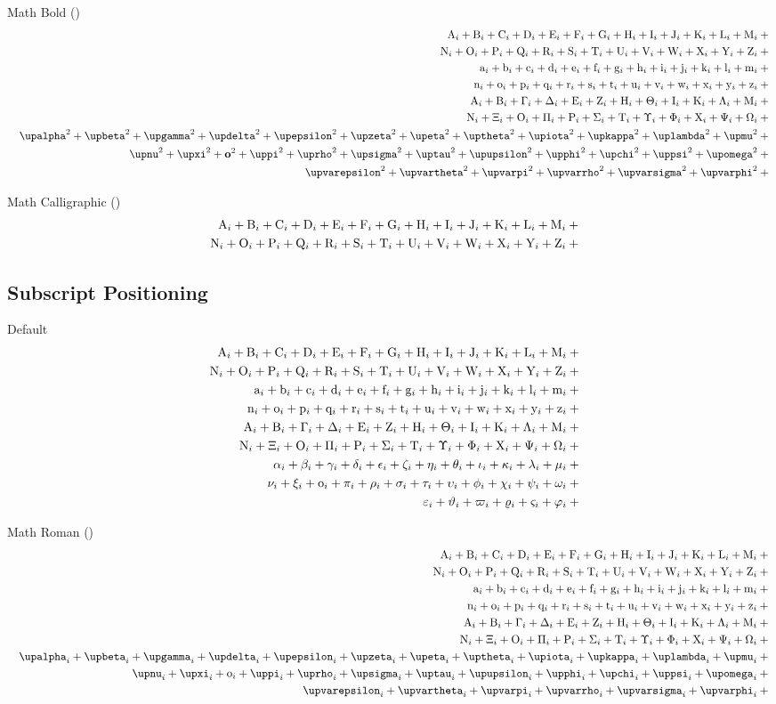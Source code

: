 \documentclass[11pt, a4paper, oneside]{article}
\theoremstyle{Plain}
\theoremstyle{Definition}
\theoremstyle{Remark}
\begin{document}
\begin{appendix}
	Math Bold (\texttt{\string\mathbf})
	\def\test#1{\mathbf{#1}^{2}+{}}%
	\begin{eqnarray*}
	  && {\testupperi}\\
	  && {\testupperii}\\
	  && {\testloweri}\\
	  && {\testlowerii}\\
	  && {\testupgreeki}\\
	  && {\testupgreekii}\\
	  && {\def\test#1{\bm{\mathbf{#1}}^{2}+{}}\testlowgreekupi}\\
	  && {\def\test#1{\bm{\mathbf{#1}}^{2}+{}}\testlowgreekupii}\\
	  && {\def\test#1{\bm{\mathbf{#1}}^{2}+{}}\testlowgreekupiii}
	\end{eqnarray*}

	Math Calligraphic (\texttt{\string\mathcal})
	\def\test#1{\mathcal{#1}^{2}+{}}%
	\begin{eqnarray*}
	  && {\testupperi}\\
	  && {\testupperii}
	\end{eqnarray*}%

	\subsection{Subscript Positioning \showfamily}

	Default
	\def\test#1{\mathnormal{#1}_{i}+{}}%
	\begin{eqnarray*}
	  && {\testupperi}\\
	  && {\testupperii}\\
	  && {\testloweri}\\
	  && {\testlowerii}\\
	  && {\testupgreeki}\\
	  && {\testupgreekii}\\
	  && {\testlowgreeki}\\
	  && {\testlowgreekii}\\
	  && {\testlowgreekiii}
	\end{eqnarray*}%

	Math Roman (\texttt{\string\mathrm})
	\def\test#1{\mathrm{#1}_{i}+{}}%
	\begin{eqnarray*}
	  && {\testupperi}\\
	  && {\testupperii}\\
	  && {\testloweri}\\
	  && {\testlowerii}\\
	  && {\testupgreeki}\\
	  && {\testupgreekii}\\
	  && {\testlowgreekupi}\\
	  && {\testlowgreekupii}\\
	  && {\testlowgreekupiii}
	\end{eqnarray*}%


\end{appendix}
\end{document}
